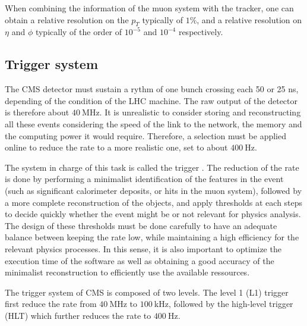         When combining the information of the muon system with the tracker, one can
        obtain a relative resolution on the $p_T$ typically of $1\%$, and a relative
        resolution on $\eta$ and $\phi$ typically of the order of $10^{-5}$ and $10^{-4}$
        respectively.

        \subsection{Trigger system}

        The CMS detector must sustain a rythm of one bunch crossing each 50 or 25 ns, depending
        of the condition of the LHC machine. The raw output of the detector is therefore
        about $40~$MHz. It is unrealistic to consider storing and reconstructing all these events
        considering the speed of the link to the network, the memory and the computing power
        it would require. Therefore, a selection must be applied online to reduce the rate
        to a more realistic one, set to about $400~$Hz.

        The system in charge of this task is called the trigger \cite{CMStrigger}. The reduction of the rate
        is done by performing a minimalist identification of the features in the event (such
        as significant calorimeter deposits, or hits in the muon system), followed by a more
        complete reconstruction of the objects, and apply thresholds at each steps to
        decide quickly whether the event might be or not relevant for physics analysis.
        The design of these thresholds must be done carefully to have an adequate balance
        between keeping the rate low, while maintaining a high efficiency for the relevant
        physics processes. In this sense, it is also important to optimize the execution
        time of the software as well as obtaining a good accuracy of the minimalist
        reconstruction to efficiently use the available ressources.

        The trigger system of CMS is composed of two levels. The level 1 (L1) trigger first
        reduce the rate from $40~$MHz to $100~$kHz, followed by the high-level trigger (HLT)
        which further reduces the rate to $400~$Hz.


